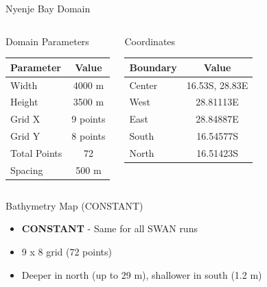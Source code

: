 \documentclass[10pt]{beamer}
\begin{document}
\begin{frame}{Nyenje Bay Domain}
\begin{columns}
\begin{block}{Domain Parameters}
\begin{tabular}{lc}
\hline
\textbf{Parameter} & \textbf{Value} \\
\hline
Width & 4000 m \\
Height & 3500 m \\
Grid X & 9 points \\
Grid Y & 8 points \\
Total Points & 72 \\
Spacing & 500 m \\
\hline
\end{tabular}
\end{block}

\begin{block}{Coordinates}
\begin{tabular}{lc}
\hline
\textbf{Boundary} & \textbf{Value} \\
\hline
Center & 16.53S, 28.83E \\
West & 28.81113E \\
East & 28.84887E \\
South & 16.54577S \\
North & 16.51423S \\
\hline
\end{tabular}
\end{block}
\end{columns}
\end{frame}

\begin{frame}{Bathymetry Map (CONSTANT)}
\begin{center}
\end{center}

\begin{itemize}
    \item \textbf{CONSTANT} - Same for all SWAN runs
    \item 9 x 8 grid (72 points)
    \item Deeper in north (up to 29 m), shallower in south (1.2 m)
\end{itemize}
\end{frame}
\end{document}
